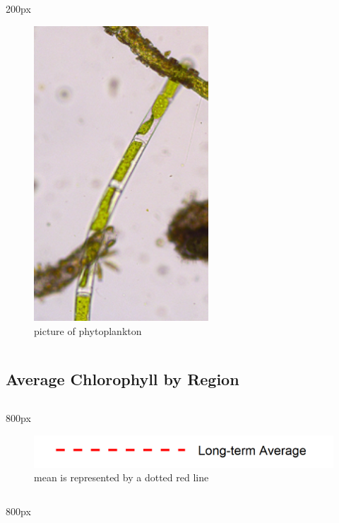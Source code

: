 \documentclass[
]{book}
\begin{document}
\begin{column}{200px\textwidth}
\begin{figure}

{\centering \includegraphics[width=2.57in]{figures/phyto} 

}

\caption{picture of phytoplankton}\label{fig:unnamed-chunk-106}
\end{figure}
\end{column}

\hypertarget{average-chlorophyll-by-region-2}{%
\subsection{Average Chlorophyll by Region}\label{average-chlorophyll-by-region-2}}

\begin{column}{800px\textwidth}
\begin{figure}
\includegraphics[width=15.25in]{figures/mline} \caption{mean is represented by a dotted red line}\label{fig:unnamed-chunk-107}
\end{figure}
\end{column}

\begin{column}{800px\textwidth}
\end{column}
\end{document}
